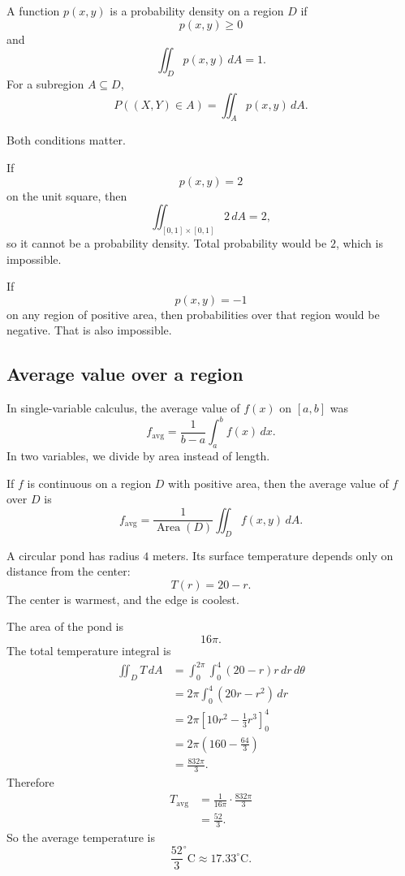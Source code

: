 \begin{definition}
A function \(p(x,y)\) is a probability density on a region \(D\) if
\[
\boxed{
    p(x,y)\ge0
}
\]
and
\[
\boxed{
    \iint_D p(x,y)\,dA=1.
}
\]
For a subregion \(A\subseteq D\),
\[
\boxed{
    P((X,Y)\in A)=\iint_A p(x,y)\,dA.
}
\]
\end{definition}

Both conditions matter.

If
\[
    p(x,y)=2
\]
on the unit square, then
\[
    \iint_{[0,1]\times[0,1]}2\,dA=2,
\]
so it cannot be a probability density.  Total probability would be \(2\), which is
impossible.

If
\[
    p(x,y)=-1
\]
on any region of positive area, then probabilities over that region would be negative.
That is also impossible.

\subsection{Average value over a region}

In single-variable calculus, the average value of \(f(x)\) on \([a,b]\) was
\[
    f_{\text{avg}}
    =
    \frac{1}{b-a}\int_a^b f(x)\,dx.
\]
In two variables, we divide by area instead of length.

\begin{definition}
If \(f\) is continuous on a region \(D\) with positive area, then the average value of
\(f\) over \(D\) is
\[
\boxed{
    f_{\text{avg}}
    =
    \frac{1}{\operatorname{Area}(D)}
    \iint_D f(x,y)\,dA.
}
\]
\end{definition}

\begin{example}
A circular pond has radius \(4\) meters.  Its surface temperature depends only on
distance from the center:
\[
    T(r)=20-r.
\]
The center is warmest, and the edge is coolest.

The area of the pond is
\[
    16\pi.
\]
The total temperature integral is
\[
\begin{aligned}
    \iint_D T\,dA
    &=
    \int_0^{2\pi}\int_0^4 (20-r)r\,dr\,d\theta\\
    &=
    2\pi\int_0^4(20r-r^2)\,dr\\
    &=
    2\pi
    \left[
        10r^2-\frac13r^3
    \right]_0^4\\
    &=
    2\pi
    \left(
        160-\frac{64}{3}
    \right)\\
    &=
    \frac{832\pi}{3}.
\end{aligned}
\]
Therefore
\[
\begin{aligned}
    T_{\text{avg}}
    &=
    \frac{1}{16\pi}\cdot\frac{832\pi}{3}\\
    &=
    \frac{52}{3}.
\end{aligned}
\]
So the average temperature is
\[
\boxed{
    \frac{52}{3}^\circ\text{C}\approx 17.33^\circ\text{C}.
}
\]
\end{example}

